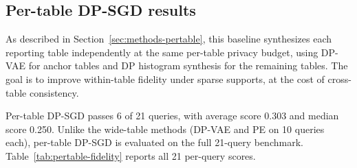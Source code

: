 \documentclass[12pt,letterpaper]{article}
\renewcommand{\_}{\textunderscore\allowbreak}
\begin{document}
\subsection{Per-table DP-SGD results}

As described in Section~\ref{sec:methods-pertable}, this baseline synthesizes each reporting table independently at the same per-table privacy budget, using DP-VAE for anchor tables and DP histogram synthesis for the remaining tables. The goal is to improve within-table fidelity under sparse supports, at the cost of cross-table consistency.

Per-table DP-SGD passes 6 of 21 queries, with average score 0.303 and median score 0.250. Unlike the wide-table methods (DP-VAE and PE on 10 queries each), per-table DP-SGD is evaluated on the full 21-query benchmark. Table~\ref{tab:pertable-fidelity} reports all 21 per-query scores.
\end{document}
